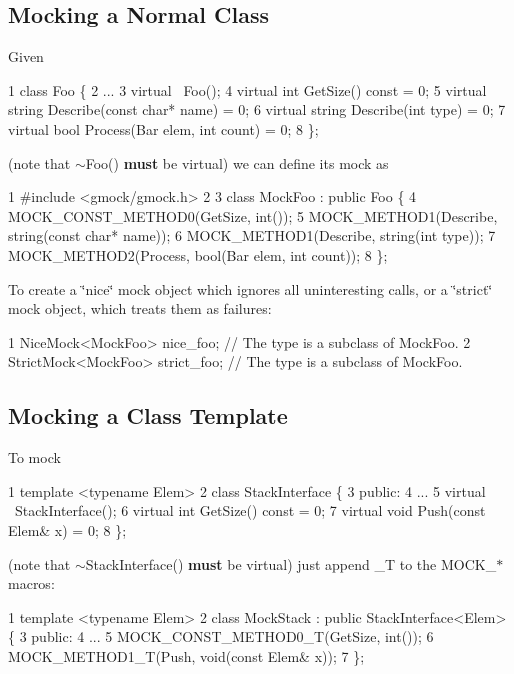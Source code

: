 \subsection*{Mocking a Normal Class}

Given 
\begin{DoxyCode}
1 class Foo \{
2   ...
3   virtual ~Foo();
4   virtual int GetSize() const = 0;
5   virtual string Describe(const char* name) = 0;
6   virtual string Describe(int type) = 0;
7   virtual bool Process(Bar elem, int count) = 0;
8 \};
\end{DoxyCode}
 (note that {\ttfamily $\sim$\+Foo()} {\bfseries must} be virtual) we can define its mock as 
\begin{DoxyCode}
1 #include <gmock/gmock.h>
2 
3 class MockFoo : public Foo \{
4   MOCK\_CONST\_METHOD0(GetSize, int());
5   MOCK\_METHOD1(Describe, string(const char* name));
6   MOCK\_METHOD1(Describe, string(int type));
7   MOCK\_METHOD2(Process, bool(Bar elem, int count));
8 \};
\end{DoxyCode}


To create a \char`\"{}nice\char`\"{} mock object which ignores all uninteresting calls, or a \char`\"{}strict\char`\"{} mock object, which treats them as failures\+: 
\begin{DoxyCode}
1 NiceMock<MockFoo> nice\_foo;     // The type is a subclass of MockFoo.
2 StrictMock<MockFoo> strict\_foo; // The type is a subclass of MockFoo.
\end{DoxyCode}


\subsection*{Mocking a Class Template}

To mock 
\begin{DoxyCode}
1 template <typename Elem>
2 class StackInterface \{
3  public:
4   ...
5   virtual ~StackInterface();
6   virtual int GetSize() const = 0;
7   virtual void Push(const Elem& x) = 0;
8 \};
\end{DoxyCode}
 (note that {\ttfamily $\sim$\+Stack\+Interface()} {\bfseries must} be virtual) just append {\ttfamily \+\_\+T} to the {\ttfamily M\+O\+C\+K\+\_\+$\ast$} macros\+: 
\begin{DoxyCode}
1 template <typename Elem>
2 class MockStack : public StackInterface<Elem> \{
3  public:
4   ...
5   MOCK\_CONST\_METHOD0\_T(GetSize, int());
6   MOCK\_METHOD1\_T(Push, void(const Elem& x));
7 \};
\end{DoxyCode}


